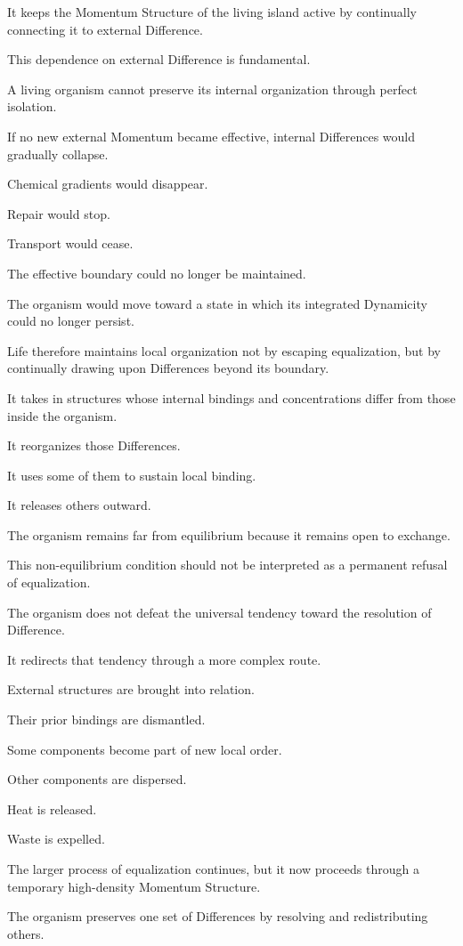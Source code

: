 It keeps the Momentum Structure of the living island active by continually connecting it to external Difference.

This dependence on external Difference is fundamental.

A living organism cannot preserve its internal organization through perfect isolation.

If no new external Momentum became effective, internal Differences would gradually collapse.

Chemical gradients would disappear.

Repair would stop.

Transport would cease.

The effective boundary could no longer be maintained.

The organism would move toward a state in which its integrated Dynamicity could no longer persist.

Life therefore maintains local organization not by escaping equalization, but by continually drawing upon Differences beyond its boundary.

It takes in structures whose internal bindings and concentrations differ from those inside the organism.

It reorganizes those Differences.

It uses some of them to sustain local binding.

It releases others outward.

The organism remains far from equilibrium because it remains open to exchange.

This non-equilibrium condition should not be interpreted as a permanent refusal of equalization.

The organism does not defeat the universal tendency toward the resolution of Difference.

It redirects that tendency through a more complex route.

External structures are brought into relation.

Their prior bindings are dismantled.

Some components become part of new local order.

Other components are dispersed.

Heat is released.

Waste is expelled.

The larger process of equalization continues, but it now proceeds through a temporary high-density Momentum Structure.

The organism preserves one set of Differences by resolving and redistributing others.

